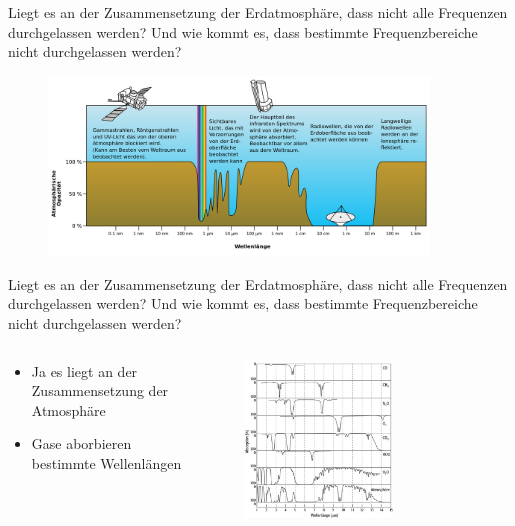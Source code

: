 \begin{frame}{Liegt es an der Zusammensetzung der Erdatmosphäre, dass nicht alle Frequenzen durchgelassen werden? Und wie kommt es, dass bestimmte Frequenzbereiche nicht durchgelassen werden?}
  \begin{figure}
    \centering
    \includegraphics[width=0.9\textwidth]{images/Atmospheric.png}
  \end{figure}
\end{frame}
  \begin{frame}{Liegt es an der Zusammensetzung der Erdatmosphäre, dass nicht alle Frequenzen durchgelassen werden? Und wie kommt es, dass bestimmte Frequenzbereiche nicht durchgelassen werden?}
    \begin{columns}
   \begin{column}{0.4\textwidth}
    \begin{itemize}
        \setlength\itemsep{2em}
      \item Ja es liegt an der Zusammensetzung der Atmosphäre
      \item Gase aborbieren bestimmte Wellenlängen
    \end{itemize}
  \vspace{2em}
  \end{column}
  \begin{column}{0.6\textwidth}
    \begin{figure}
      \centering
      \includegraphics[width=0.65\textwidth]{images/atmo_fen_w.jpg}
    \end{figure}
  \end{column}
    \end{columns}
  \end{frame}


